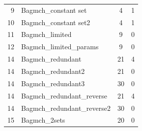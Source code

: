 \documentclass[12pt,journal,duplex]{IEEEtran}
\begin{document}
\begin{table}[h]
\begin{tabular}{@{}rlcc@{}}
	9                           & Bagmch\_constant set        & 4                                                                            & 1                                                                                       \\
	10                          & Bagmch\_constant set2       & 4                                                                            & 1                                                                                       \\
	11                          & Bagmch\_limited             & 9                                                                            & 0                                                                                       \\
	12                          & Bagmch\_limited\_params     & 9                                                                            & 0                                                                                       \\
	14                          & Bagmch\_redundant           & 21                                                                           & 4                                                                                       \\
	14                          & Bagmch\_redundant2          & 21                                                                           & 0                                                                                       \\
	14                          & Bagmch\_redundant3          & 30                                                                           & 0                                                                                       \\
	14                          & Bagmch\_redundant\_reverse  & 21                                                                           & 4                                                                                       \\
	14                          & Bagmch\_redundant\_reverse2 & 30                                                                           & 0                                                                                       \\
	15                          & Bagmch\_2sets               & 20                                                                           & 0                                                                                       \\

\end{tabular}
\end{table}
\end{document}
